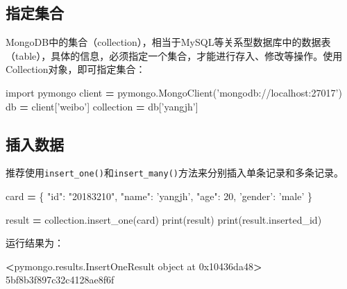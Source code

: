\documentclass[]{ctexbook}
\newenvironment{Shaded}{\begin{snugshade}}{\end{snugshade}}
\newcommand{\BuiltInTok}[1]{#1}
\newcommand{\DecValTok}[1]{\textcolor[rgb]{0.00,0.00,0.81}{#1}}
\newcommand{\ExtensionTok}[1]{#1}
\newcommand{\ImportTok}[1]{#1}
\newcommand{\NormalTok}[1]{#1}
\newcommand{\OperatorTok}[1]{\textcolor[rgb]{0.81,0.36,0.00}{\textbf{#1}}}
\newcommand{\StringTok}[1]{\textcolor[rgb]{0.31,0.60,0.02}{#1}}
\begin{document}
\hypertarget{ux6307ux5b9aux96c6ux5408}{%
\subsection{指定集合}\label{ux6307ux5b9aux96c6ux5408}}

MongoDB中的集合（collection），相当于MySQL等关系型数据库中的数据表（table），具体的信息，必须指定一个集合，才能进行存入、修改等操作。使用Collection对象，即可指定集合：

\begin{Shaded}
\begin{Highlighting}[]
\ImportTok{import}\NormalTok{ pymongo}
\NormalTok{client }\OperatorTok{=}\NormalTok{ pymongo.MongoClient(}\StringTok{'mongodb://localhost:27017'}\NormalTok{)}
\NormalTok{db }\OperatorTok{=}\NormalTok{ client[}\StringTok{'weibo'}\NormalTok{]}
\NormalTok{collection }\OperatorTok{=}\NormalTok{ db[}\StringTok{'yangjh'}\NormalTok{]}
\end{Highlighting}
\end{Shaded}

\hypertarget{ux63d2ux5165ux6570ux636e}{%
\subsection{插入数据}\label{ux63d2ux5165ux6570ux636e}}

推荐使用\texttt{insert\_one()}和\texttt{insert\_many()}方法来分别插入单条记录和多条记录。

\begin{Shaded}
\begin{Highlighting}[]
\NormalTok{card }\OperatorTok{=}\NormalTok{ \{}
    \StringTok{"id"}\NormalTok{: }\StringTok{"20183210"}\NormalTok{,}
    \StringTok{"name"}\NormalTok{: }\StringTok{'yangjh'}\NormalTok{,}
    \StringTok{"age"}\NormalTok{: }\DecValTok{20}\NormalTok{,}
    \StringTok{'gender'}\NormalTok{: }\StringTok{'male'}
\NormalTok{\}}

\NormalTok{result }\OperatorTok{=}\NormalTok{ collection.insert_one(card)}
\BuiltInTok{print}\NormalTok{(result)}
\BuiltInTok{print}\NormalTok{(result.inserted_id)}
\end{Highlighting}
\end{Shaded}

运行结果为：

\begin{Shaded}
\begin{Highlighting}[]
\OperatorTok{<}\ExtensionTok{pymongo.results.InsertOneResult}\NormalTok{ object at 0x10436da48}\OperatorTok{>}
\ExtensionTok{5bf8b3f897c32c4128ae8f6f}
\end{Highlighting}
\end{Shaded}
\end{document}

